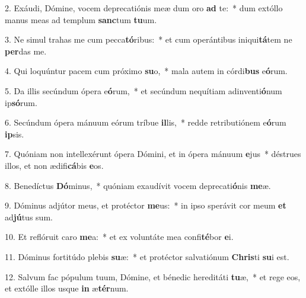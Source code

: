 2. Exáudi, Dómine, vocem deprecatiónis meæ dum oro \textbf{ad} te:~*  dum extóllo manus meas ad templum \textbf{sanc}tum \textbf{tu}um.\

3. Ne simul trahas me cum pecca\textbf{tó}ribus:~*  et cum operántibus iniqui\textbf{tá}tem ne \textbf{per}das me.\

4. Qui loquúntur pacem cum próximo \textbf{su}o,~*  mala autem in córdi\textbf{bus} e\textbf{ó}rum.\

5. Da illis secúndum ópera e\textbf{ó}rum,~*  et secúndum nequítiam adinventi\textbf{ó}num ip\textbf{só}rum.\

6. Secúndum ópera mánuum eórum tríbue \textbf{il}lis,~*  redde retributiónem e\textbf{ó}rum \textbf{ip}sis.\

7. Quóniam non intellexérunt ópera Dómini, et in ópera mánuum \textbf{e}jus~*  déstrues illos, et non ædifi\textbf{cá}bis \textbf{e}os.\

8. Benedíctus \textbf{Dó}minus,~*  quóniam exaudívit vocem deprecati\textbf{ó}nis \textbf{me}æ.\

9. Dóminus adjútor meus, et protéctor \textbf{me}us:~*  in ipso sperávit cor meum \textbf{et} ad\textbf{jú}tus sum.\

10. Et reflóruit caro \textbf{me}a:~*  et ex voluntáte mea confi\textbf{té}bor \textbf{e}i.\

11. Dóminus fortitúdo plebis \textbf{su}æ:~*  et protéctor salvatiónum \textbf{Chris}ti \textbf{su}i est.\

12. Salvum fac pópulum tuum, Dómine, et bénedic hereditáti \textbf{tu}æ,~*  et rege eos, et extólle illos usque \textbf{in} æ\textbf{tér}num.\

